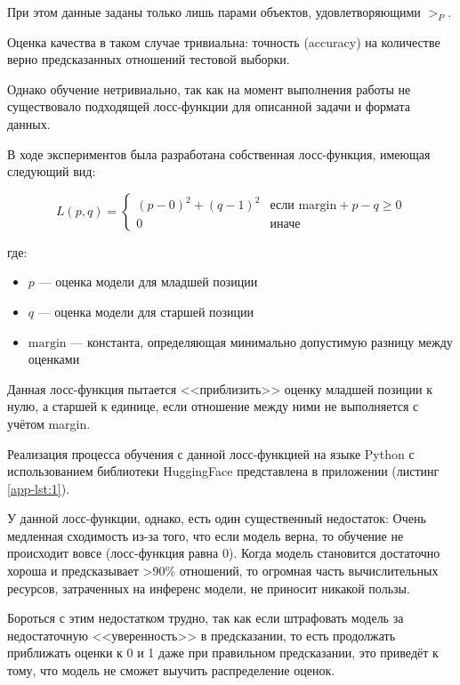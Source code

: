 \documentclass[14pt]{mmcs_article}
\begin{document}
При этом данные заданы только лишь парами объектов, удовлетворяющими $>_{P}$.

Оценка качества в таком случае тривиальна: точность (accuracy) на количестве верно предсказанных отношений тестовой выборки.

Однако обучение нетривиально, так как на момент выполнения работы не существовало подходящей лосс-функции для описанной задачи и формата данных.

В ходе экспериментов была разработана собственная лосс-функция, имеющая следующий вид:

\begin{equation}
  \label{eq:custom_loss_function}
  L(p, q) = \begin{cases}
    (p - 0)^2 + (q - 1)^2 & \text{если } \text{margin} + p - q \geq 0 \\
    0                     & \text{иначе}
  \end{cases}
\end{equation}

где:
\begin{itemize}
  \item $p$ --- оценка модели для младшей позиции
  \item $q$ --- оценка модели для старшей позиции
  \item $\text{margin}$ --- константа, определяющая минимально допустимую разницу между оценками
\end{itemize}

Данная лосс-функция пытается <<приблизить>> оценку младшей позиции к нулю, а старшей к единице, если отношение между ними не выполняется с учётом margin.

Реализация процесса обучения с данной лосс-функцией на языке Python с использованием библиотеки HuggingFace \cite{wolf2020huggingfacestransformersstateoftheartnatural} представлена в приложении (листинг \ref{app-lst:1}).

У данной лосс-функции, однако, есть один существенный недостаток: Очень медленная сходимость из-за того, что если модель верна, то обучение не происходит вовсе (лосс-функция равна 0). Когда модель становится достаточно хороша и предсказывает >90\% отношений, то огромная часть вычислительных ресурсов, затраченных на инференс модели, не приносит никакой пользы.

Бороться с этим недостатком трудно, так как если штрафовать модель за недостаточную <<уверенность>> в предсказании, то есть продолжать приближать оценки к 0 и 1 даже при правильном предсказании, это приведёт к тому, что модель не сможет выучить распределение оценок.
\end{document}
